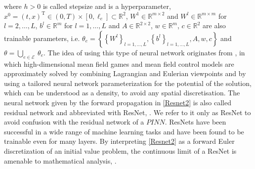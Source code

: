 where $h > 0$ is called stepsize and is a hyperparameter, $x^0 = (t, x)^{\mathrm{T}} \in (0, T) \times [0, \ell_e] \subset \mathbb{R}^2$, $W^1 \in \mathbb{R}^{m \times 2}$ and $W^l \in \mathbb{R}^{m \times m}$ for $l = 2, \ldots, L$, $b^l \in \mathbb{R}^{m}$ for $l = 1, \ldots, L$ and $A \in \mathbb{R}^{2 \times 2}$, $w \in \mathbb{R}^m$, $c \in \mathbb{R}^2$ are also trainable parameters, i.e. $\theta_e = \left\{ \left\{ W^l \right\}_{l = 1, \ldots, L}, \left\{ b^l \right\}_{l = 1, \ldots, L}, A, w, c \right\}$ and $\theta = \bigcup_{e \in \mathcal{E}} \ \theta_e$. The idea of using this type of neural network originates from \cite{RuthottoOsherLiNurbekyanFung2020}, in which high-dimensional mean field games and mean field control models are approximately solved by combining Lagrangian and Eulerian viewpoints and by using a tailored neural network parameterization for the potential of the solution, which can be understood as a density, to avoid any spatial discretisation. The neural network given by the forward propagation in \cref{Resnet2} is also called residual network and abbreviated with ResNet, \cite{HeZhangRenSun:2015}. We refer to it only as ResNet to avoid confusion with the residual network of a $PINN$. ResNets have been successful in a wide range of machine learning tasks and have been found to be trainable even for many layers. By interpreting \cref{Resnet2} as a forward Euler discretization of an initial value problem, the continuous limit of a ResNet is amenable to mathematical analysis, \cite[p.~6]{RuthottoOsherLiNurbekyanFung2020}. \\


